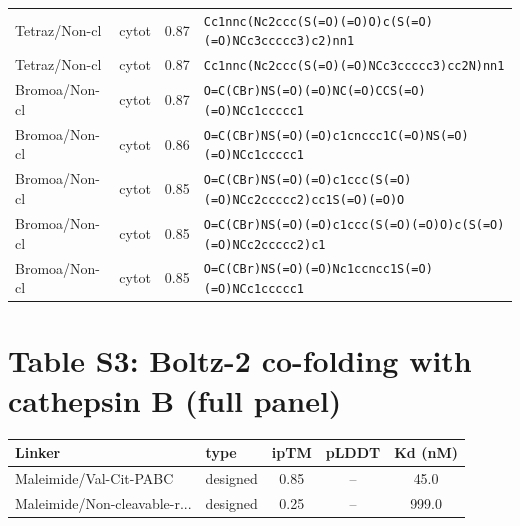 \documentclass[10pt]{article}
\begin{document}
\begin{longtable}{l l c p{9cm}}
Tetraz/Non-cl & cytot & 0.87 & \texttt{Cc1nnc(Nc2ccc(S(=O)(=O)O)c(S(=O)(=O)NCc3ccccc3)c2)nn1} \\
Tetraz/Non-cl & cytot & 0.87 & \texttt{Cc1nnc(Nc2ccc(S(=O)(=O)NCc3ccccc3)cc2N)nn1} \\
Bromoa/Non-cl & cytot & 0.87 & \texttt{O=C(CBr)NS(=O)(=O)NC(=O)CCS(=O)(=O)NCc1ccccc1} \\
Bromoa/Non-cl & cytot & 0.86 & \texttt{O=C(CBr)NS(=O)(=O)c1cnccc1C(=O)NS(=O)(=O)NCc1ccccc1} \\
Bromoa/Non-cl & cytot & 0.85 & \texttt{O=C(CBr)NS(=O)(=O)c1ccc(S(=O)(=O)NCc2ccccc2)cc1S(=O)(=O)O} \\
Bromoa/Non-cl & cytot & 0.85 & \texttt{O=C(CBr)NS(=O)(=O)c1ccc(S(=O)(=O)O)c(S(=O)(=O)NCc2ccccc2)c1} \\
Bromoa/Non-cl & cytot & 0.85 & \texttt{O=C(CBr)NS(=O)(=O)Nc1ccncc1S(=O)(=O)NCc1ccccc1} \\
\bottomrule\end{longtable}
\section{Table S3: Boltz-2 co-folding with cathepsin B (full panel)}
\begin{longtable}{l l c c c}\toprule
Linker & type & ipTM & pLDDT & Kd (nM) \\ \midrule\endhead
Maleimide/Val-Cit-PABC & designed & 0.85 & -- & 45.0 \\
Maleimide/Non-cleavable-r... & designed & 0.25 & -- & 999.0 \\
\bottomrule\end{longtable}
\end{document}
